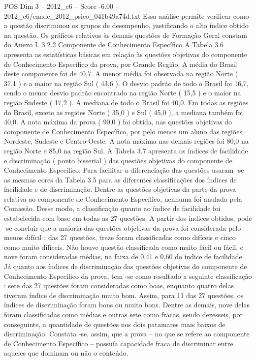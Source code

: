 \begin{textsample}{POS Dim 3 – 2012\_c6 – Score -6.00 – 2012\_c6/enade\_2012\_psico\_041b49a74d.txt}
Essa análise permite verificar como a questão discriminou os grupos de desempenho, justificando o alto índice obtido na questão.
Os gráficos relativos às demais questões de Formação Geral constam do Anexo I. 3.2.2 Componente de Conhecimento Específico A Tabela 3.6 apresenta as estatísticas básicas em relação às questões objetivas do componente de Conhecimento Específico da prova, por Grande Região.
A média do Brasil deste componente foi de 40,7.
A menor média foi observada na região Norte ( 37,1 ) e a maior na região Sul ( 43,6 ).
O desvio padrão de todo o Brasil foi 16,7, sendo o menor desvio padrão encontrado na região Norte ( 15,5 ) e o maior na região Sudeste ( 17,2 ).
A mediana de todo o Brasil foi 40,0.
Em todas as regiões do Brasil, exceto as regiões Norte ( 35,0 ) e Sul ( 45,0 ), a mediana também foi 40,0.
A nota máxima da prova ( 90,0 ) foi obtida, nas questões objetivas do componente de Conhecimento Específico, por pelo menos um aluno das regiões Nordeste, Sudeste e Centro-Oeste.
A nota máxima nas demais regiões foi 80,0 na região Norte e 85,0 na região Sul.
A Tabela 3.7 apresenta os índices de facilidade e discriminação ( ponto bisserial ) das questões objetivas do componente de Conhecimento Específico.
Para facilitar a diferenciação das questões usaram -se as mesmas cores da Tabela 3.5 para as diferentes classificações dos índices de facilidade e de discriminação.
Dentre as questões objetivas da parte da prova relativa ao componente de Conhecimento Específico, nenhuma foi anulada pela Comissão.
Desse modo, a classificação quanto ao índice de facilidade foi estabelecida com base em todas as 27 questões.
A partir dos índices obtidos, pode -se concluir que a maioria das questões objetivas da prova foi considerada pelo menos difícil : das 27 questões, treze foram classificadas como difíceis e cinco como muito difíceis.
Não houve questão classificada como muito fácil ou fácil, e nove foram consideradas médias, na faixa de 0,41 e 0,60 do índice de facilidade.
Já quanto aos índices de discriminação das questões objetivas do componente de Conhecimento Específico da prova, tem -se como resultado a seguinte classificação : sete das 27 questões foram consideradas como boas, enquanto quatro delas tiveram índice de discriminação muito bom.
Assim, para 11 das 27 questões, os índices de discriminação foram bons ou muito bons.
Dentre as demais, nove delas foram classificadas como médias e outras sete como fracas, sendo dezesseis, por conseguinte, a quantidade de questões nos dois patamares mais baixos de discriminação.
Constata -se, assim, que a prova – no que se refere ao componente de Conhecimento Específico – possuía capacidade fraca de discriminar entre aqueles que dominam ou não o conteúdo.

\end{textsample}
